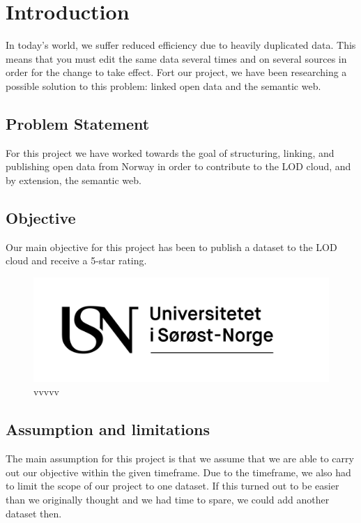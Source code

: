 \chapter{Introduction}
In today’s world, we suffer reduced efficiency due to heavily duplicated data. This means that you must edit the same data several times and on several sources in order for the change to take effect. Fort our project, we have been researching a possible solution to this problem: linked open data and the semantic web.

\section{Problem Statement}
For this project we have worked towards the goal of structuring, linking, and publishing open data from Norway in order to contribute to the LOD cloud, and by extension, the semantic web.

\section{Objective}
Our main objective for this project has been to publish a dataset to the LOD cloud and receive a 5-star rating.

\begin{figure}[H]
  \centering
  \includegraphics[width=0.99\linewidth]{figures/logos/USN_logo_rgb.png}
  \caption{vvvvv}
\end{figure}%

\section{Assumption and limitations}
The main assumption for this project is that we assume that we are able to carry out our objective within the given timeframe. Due to the timeframe, we also had to limit the scope of our project to one dataset. If this turned out to be easier than we originally thought and we had time to spare, we could add another dataset then.